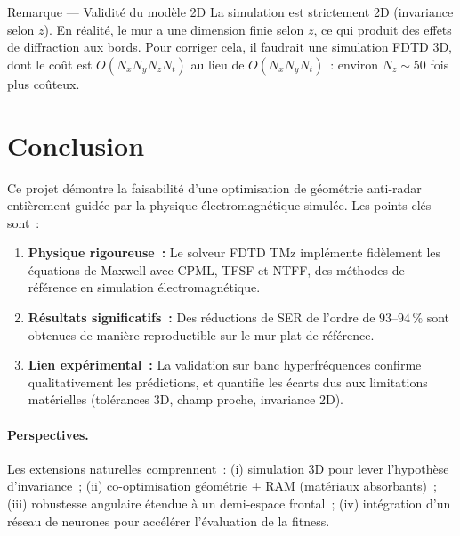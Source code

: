\documentclass[12pt,a4paper]{article}
\numberwithin{equation}{section}
\numberwithin{figure}{section}
\numberwithin{table}{section}
\begin{document}
\begin{remarque}{Remarque --- Validité du modèle 2D}
La simulation est strictement 2D (invariance selon $z$). En réalité, le mur
a une dimension finie selon $z$, ce qui produit des effets de diffraction
aux bords. Pour corriger cela, il faudrait une simulation FDTD 3D, dont le
coût est $O(N_x N_y N_z N_t)$ au lieu de $O(N_x N_y N_t)$~: environ $N_z \sim 50$
fois plus coûteux.
\end{remarque}

\section{Conclusion}

Ce projet démontre la faisabilité d'une optimisation de géométrie anti-radar
entièrement guidée par la physique électromagnétique simulée. Les points clés
sont~:

\begin{enumerate}
    \item \textbf{Physique rigoureuse~:} Le solveur FDTD TMz implémente
    fidèlement les équations de Maxwell avec CPML, TFSF et NTFF, des méthodes
    de référence en simulation électromagnétique.

    \item \textbf{Résultats significatifs~:} Des réductions de SER de l'ordre
    de $93$--$94\,\%$ sont obtenues de manière reproductible sur le mur plat
    de référence.

    \item \textbf{Lien expérimental~:} La validation sur banc hyperfréquences
    confirme qualitativement les prédictions, et quantifie les écarts dus aux
    limitations matérielles (tolérances 3D, champ proche, invariance 2D).
\end{enumerate}

\paragraph{Perspectives.}
Les extensions naturelles comprennent~: (i) simulation 3D pour lever
l'hypothèse d'invariance~; (ii) co-optimisation géométrie + RAM (matériaux
absorbants)~; (iii) robustesse angulaire étendue à un demi-espace frontal~;
(iv) intégration d'un réseau de neurones pour accélérer
l'évaluation de la fitness.


\end{document}
